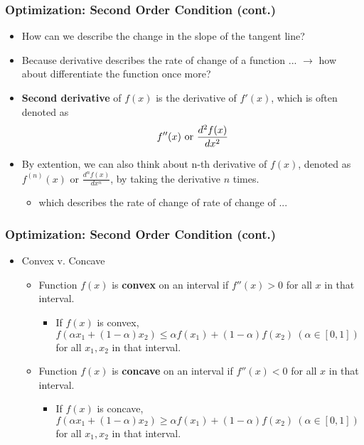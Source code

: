 \documentclass[pdflatex, 12pt]{beamer}
\begin{document}
\begin{frame}
\frametitle{Optimization: Second Order Condition (cont.)}
\begin{itemize}
\item How can we describe the change in the slope of the tangent line?
\vspace{0.4cm}
\item Because derivative describes the rate of change of a function ... $\rightarrow$ how about differentiate the function once more?
\vspace{0.4cm}
\item \textbf{Second derivative} of $f(x)$ is the derivative of $f'(x)$, which is often denoted as 
 \begin{equation}
 f''(x)\ \mathrm{or} \ \frac{d^2 f(x)}{dx^2} \notag 
 \end{equation}
\vspace{0.2cm}
\item By extention, we can also think about n-th derivative of $f(x)$, denoted as $f^{(n)} (x)$ or $\frac{d^n f(x)}{dx^n}$, by taking the derivative $n$ times.
 \begin{itemize}
 \item which describes the rate of change of rate of change of ...
 \end{itemize} 
\end{itemize}
\end{frame}

\begin{frame}
\frametitle{Optimization: Second Order Condition (cont.)}
\begin{itemize}
\item Convex v. Concave
 \begin{itemize}
 \item Function $f(x)$ is \textbf{convex} on an interval if $f''(x) > 0$ for all $x$ in that interval.
  \begin{itemize}
  \item If $f(x)$ is convex, $f(\alpha x_1 + (1 - \alpha) x_2) \leq \alpha f(x_1) + (1 - \alpha)f(x_2) \ (\alpha \in [0, 1])$ for all $x_1, x_2$ in that interval.
  \end{itemize}
 \item Function $f(x)$ is \textbf{concave} on an interval if $f''(x) < 0$ for all $x$ in that interval.
  \begin{itemize}
  \item If $f(x)$ is concave, $f(\alpha x_1 + (1 - \alpha) x_2) \geq \alpha f(x_1) + (1 - \alpha)f(x_2) \ (\alpha \in [0, 1])$ for all $x_1, x_2$ in that interval.
  \end{itemize}
 \end{itemize}
\end{itemize}
\end{frame}
\end{document}
